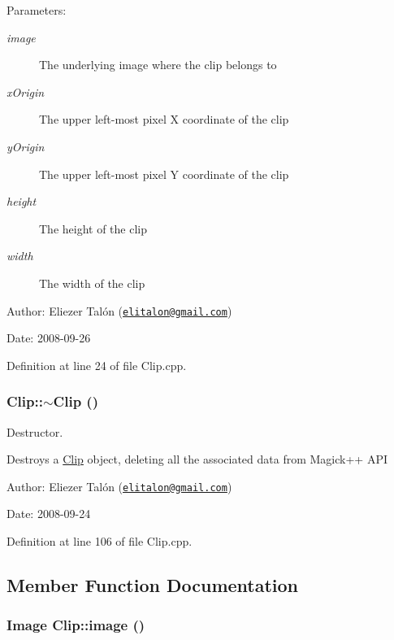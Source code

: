 \begin{Desc}
\item[Parameters:]
\begin{description}
\item[{\em image}]The underlying image where the clip belongs to \item[{\em xOrigin}]The upper left-most pixel X coordinate of the clip \item[{\em yOrigin}]The upper left-most pixel Y coordinate of the clip \item[{\em height}]The height of the clip \item[{\em width}]The width of the clip\end{description}
\end{Desc}
\begin{Desc}
\item[Author:]Eliezer Talón (\href{mailto:elitalon@gmail.com}{\tt elitalon@gmail.com}) \end{Desc}
\begin{Desc}
\item[Date:]2008-09-26 \end{Desc}


Definition at line 24 of file Clip.cpp.\hypertarget{class_clip_88647ed65e3482b5e0533ec98667b0fa}{
\subsubsection[$\sim$Clip]{\setlength{\rightskip}{0pt plus 5cm}Clip::$\sim$Clip ()}}
\label{class_clip_88647ed65e3482b5e0533ec98667b0fa}


Destructor. 

Destroys a \hyperlink{class_clip}{Clip} object, deleting all the associated data from Magick++ API

\begin{Desc}
\item[Author:]Eliezer Talón (\href{mailto:elitalon@gmail.com}{\tt elitalon@gmail.com}) \end{Desc}
\begin{Desc}
\item[Date:]2008-09-24 \end{Desc}


Definition at line 106 of file Clip.cpp.

\subsection{Member Function Documentation}
\hypertarget{class_clip_f4500103f1babcf2b9283eaffc6af96a}{
\subsubsection[image]{\setlength{\rightskip}{0pt plus 5cm}Image Clip::image ()}}
\label{class_clip_f4500103f1babcf2b9283eaffc6af96a}


